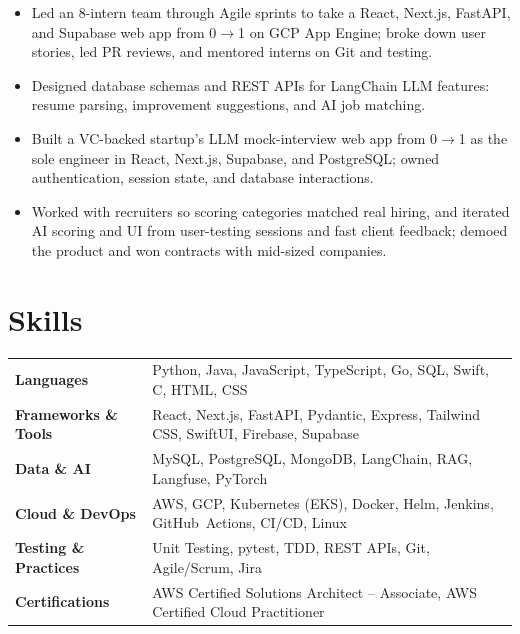 \documentclass[11pt, letterpaper]{article}
\begin{document}
\vspace{1pt}
\begin{itemize}
  \item Led an 8-intern team through Agile sprints to take a React, Next.js, FastAPI, and Supabase web app from 0$\to$1 on GCP App Engine; broke down user stories, led PR reviews, and mentored interns on Git and testing.
  \item Designed database schemas and REST APIs for LangChain LLM features: resume parsing, improvement suggestions, and AI job matching.
\end{itemize}

\vspace{1pt}
\begin{itemize}
  \item Built a VC-backed startup's LLM mock-interview web app from 0$\to$1 as the sole engineer in React, Next.js, Supabase, and PostgreSQL; owned authentication, session state, and database interactions.
  \item Worked with recruiters so scoring categories matched real hiring, and iterated AI scoring and UI from user-testing sessions and fast client feedback; demoed the product and won contracts with mid-sized companies.
\end{itemize}

\section{Skills}
\begin{tabularx}{\textwidth}{@{}l @{\hspace{7pt}} >{\raggedright\arraybackslash}X@{}}
  \textbf{Languages} & Python, Java, JavaScript, TypeScript, Go, SQL, Swift, C, HTML, CSS \\[1pt]
  \textbf{Frameworks \& Tools} & React, Next.js, FastAPI, Pydantic, Express, Tailwind CSS, SwiftUI, Firebase, Supabase \\[1pt]
  \textbf{Data \& AI} & MySQL, PostgreSQL, MongoDB, LangChain, RAG, Langfuse, PyTorch \\[1pt]
  \textbf{Cloud \& DevOps} & AWS, GCP, Kubernetes (EKS), Docker, Helm, Jenkins, GitHub~Actions, CI/CD, Linux \\[1pt]
  \textbf{Testing \& Practices} & Unit Testing, pytest, TDD, REST APIs, Git, Agile/Scrum, Jira \\[1pt]
  \textbf{Certifications} & AWS Certified Solutions Architect -- Associate, AWS Certified Cloud Practitioner \\
\end{tabularx}
\end{document}
